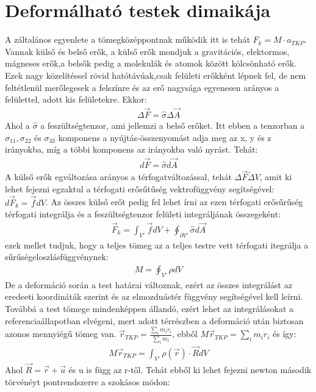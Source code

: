 \documentclass{article}
\begin{document}
\section{Deformálható testek dimaikája}
A záltalános egyenlete a tömegközéppontnak működik itt is tehát $F_k = M \cdot a_{TKP}$.  Vannak külső és belső erők, a külső erők mondjuk a gravitációs, elektormos, mágneses erők,a belsők pedig a molekulák és atomok között kölcsönható erők. Ezek nagy közelítéssel rövid hatótávúak,csak felületi erőkként lépnek fel, de nem feltétlenül merőlegesek a felszínre és az erő nagysága egyenesen arányos a felülettel, adott kis felületekre. Ekkor:
\begin{align*}
\Delta \vec{F} = \hat{\sigma}  \Delta \vec{A} 
\end{align*} 
Ahol a $\hat{\sigma}$ a feszültségtenzor, ami jellemzi a belső erőket. 
Itt ebben a tenzorban a $\sigma_11, \sigma_22$ és $\sigma_33$ komponens a nyújtás-összenyomást adja meg az x, y és z irányokba, míg a többi komponens az irányokba való nyrást. Tehát:
\begin{align*}
d\vec{F} = \hat{\sigma} d\vec{A}
\end{align*}
A külső erők egváltozása arányos a térfogatváltozással, tehát $\Delta\vec{F} \tilde \Delta V$, amit ki lehet fejezni egzaktul a térfogati erősűtűség vektrofüggvény segítségével: $d\vec{F}_k = \vec{f} dV $. Az összes külső erőt pedig fel lehet írni az ezen térfogati erősűrűség térfogati integrálja és a feszültségtenzor felületi integráljának összegeként:
\begin{align*}
\vec{F}_k = \int_{V'} \vec{f} dV + \oint_{\partial V'} \hat{\sigma} d\vec{A} 
\end{align*}
ezek mellet tudjuk, hogy a teljes tömeg az a teljes testre vett térfogati itegrálja a sűrűségeloszlásfüggvénynek:
\begin{align*}
M = \oint_{V'} \rho dV
\end{align*}
De a deformáció során a test határai változnak, ezért az összes integrálást az eredeeti koordináták szerint és az elmozduástér függvény segítségével kell leírni. Továbbá a test tömege mindenképpen állandó, ezért lehet az integrálásokat a referenciaállapotban elvégeni, mert adott térrészben a deformáció után biztosan azonos mennyiégű tömeg van. $\vec{r}_{TKP} = \frac{\sum_i m_i r_i}{\sum_i m_i}$, ebből $M\vec{r}_{TKP} = \sum_i m_i r_i$ és így:
\begin{align*}
M\vec{r}_{TKP} = \int_{V'} \rho(\vec{r}) \cdot \vec{R} dV
\end{align*}
Ahol $\vec{R} = \vec{r} +  \vec{u}$ és u is függ az r-től. Tehát ebből ki lehet fejezni newton második törvénéyt pontrendszerre a szokásos módon:
\end{document}
